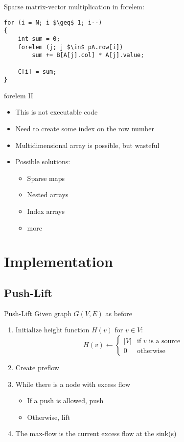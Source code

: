 \documentclass{beamer}
\begin{document}
\begin{frame}[fragile]
	\begin{example}
		Sparse matrix-vector multiplication in forelem:
\begin{lstlisting}[mathescape]
for (i = N; i $\geq$ 1; i--)
{
    int sum = 0;
    forelem (j; j $\in$ pA.row[i])
        sum += B[A[j].col] * A[j].value;

    C[i] = sum;
}
\end{lstlisting}
	\end{example}
\end{frame}

\begin{frame}{forelem II}
	\begin{itemize}
		\item This is not executable code
		\item Need to create some index on the row number\pause
		\item Multidimensional array is possible, but wasteful
		\item Possible solutions:
			\begin{itemize}
				\item Sparse maps
				\item Nested arrays
				\item Index arrays
				\item \textellipsis more
			\end{itemize}
	\end{itemize}
\end{frame}

\section{Implementation}

\subsection{Push-Lift}

\begin{frame}{Push-Lift}
	Given graph $G(V, E)$ as before
	\begin{enumerate}
		\item Initialize height function $H(v)$ for $v \in V$:
			$$
			H(v) \gets \begin{cases}
				|V| & \text{if } v \text{ is a source} \\
				0 & \text{otherwise}
			\end{cases}
			$$

		\item Create preflow
		\item While there is a node with excess flow
			\begin{itemize}
				\item If a push is allowed, push
				\item Otherwise, lift
			\end{itemize}

		\item The max-flow is the current excess flow at the sink(s)
	\end{enumerate}
\end{frame}
\end{document}
